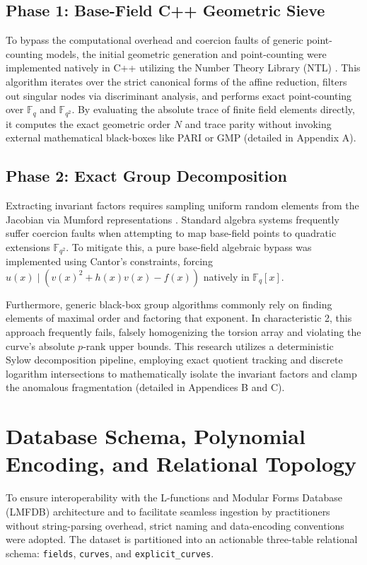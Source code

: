 \documentclass[11pt,letterpaper]{article}
\begin{document}
\subsection{Phase 1: Base-Field C++ Geometric Sieve}
To bypass the computational overhead and coercion faults of generic point-counting models, the initial geometric generation and point-counting were implemented natively in C++ utilizing the Number Theory Library (NTL) \cite{ShoupNTL}. This algorithm iterates over the strict canonical forms of the affine reduction, filters out singular nodes via discriminant analysis, and performs exact point-counting over $\mathbb{F}_q$ and $\mathbb{F}_{q^2}$. By evaluating the absolute trace of finite field elements directly, it computes the exact geometric order $N$ and trace parity without invoking external mathematical black-boxes like PARI or GMP (detailed in Appendix A).

\subsection{Phase 2: Exact Group Decomposition}
Extracting invariant factors requires sampling uniform random elements from the Jacobian via Mumford representations \cite{Cantor1987}. Standard algebra systems frequently suffer coercion faults when attempting to map base-field points to quadratic extensions $\mathbb{F}_{q^2}$. To mitigate this, a pure base-field algebraic bypass was implemented using Cantor's constraints, forcing $u(x) \mid \left( v(x)^2 + h(x)v(x) - f(x) \right)$ natively in $\mathbb{F}_q[x]$.

Furthermore, generic black-box group algorithms commonly rely on finding elements of maximal order and factoring that exponent. In characteristic 2, this approach frequently fails, falsely homogenizing the torsion array and violating the curve's absolute $p$-rank upper bounds. This research utilizes a deterministic Sylow decomposition pipeline, employing exact quotient tracking and discrete logarithm intersections to mathematically isolate the invariant factors and clamp the anomalous fragmentation (detailed in Appendices B and C).

\section{Database Schema, Polynomial Encoding, and Relational Topology}
To ensure interoperability with the L-functions and Modular Forms Database (LMFDB) architecture and to facilitate seamless ingestion by practitioners without string-parsing overhead, strict naming and data-encoding conventions were adopted. The dataset is partitioned into an actionable three-table relational schema: \texttt{fields}, \texttt{curves}, and \texttt{explicit\_curves}.
\end{document}
